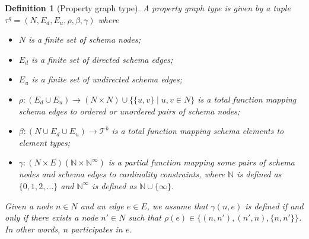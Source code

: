 \documentclass[a4paper]{article}
\makeatletter
\newtheorem{definition}[theorem]{Definition}
\newcommand{\N}{\mathbb{N}}
\newcommand{\pto}{}%
\DeclareRobustCommand{\pto}{\mathrel{\mathpalette\p@to@gets\to}}
\newcommand{\p@to@gets}[2]{%
  \ooalign{\hidewidth$\m@th#1\mapstochar\mkern5mu$\hidewidth\cr$\m@th#1\to$\cr}%
}
\newcommand{\btypes}{\mathcal{T}^b}
\newcommand{\gtype}{\tau^g}
\makeatother
\begin{document}
\begin{definition}[Property graph type]
  A \emph{property graph type} is given by a tuple $\gtype = (N, E_d, E_u, \rho, \beta, \gamma)$ where 
  \begin{itemize}
    \item $N$ is a finite set of schema nodes;
    \item $E_d$ is a finite set of directed schema edges;
    \item $E_u$ is a finite set of undirected schema edges;
    \item $\rho : (E_d \cup E_u) \to (N \times N) \cup \{\{u, v\} \mid u, v \in N\}$ is a total function mapping schema edges to ordered or unordered pairs of schema nodes;
    \item $\beta : (N \cup E_d \cup E_u) \to \btypes$ is a total function mapping schema elements to element types;
    \item $\gamma : (N \times E) \pto (\N \times \N^\infty)$ is a partial function mapping some pairs of schema nodes and schema edges to cardinality constraints, where $\N$ is defined as $\{0, 1, 2, \ldots\}$ and $\N^\infty$ is defined as $\N \cup \{\infty\}$.
  \end{itemize}


  Given a node $n \in N$ and an edge $e \in E$, we assume that $\gamma(n, e)$ is defined if and only if there exists a node $n' \in N$ such that $\rho(e) \in \{(n, n'), (n', n), \{n, n'\}\}$. In other words, $n$ \emph{participates} in $e$.
\end{definition}
\end{document}
